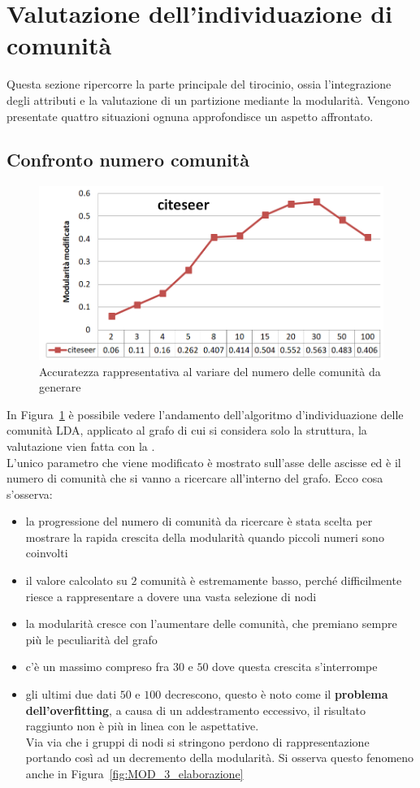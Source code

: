 \section{Valutazione dell'individuazione di comunità}
Questa sezione ripercorre la parte principale del tirocinio, ossia l'integrazione degli attributi e la valutazione di un partizione mediante la modularità. Vengono presentate quattro situazioni ognuna approfondisce un aspetto affrontato.
%
\subsection{Confronto numero comunità}%
%
\begin{figure}[htp]
	\centering
	\includegraphics[width=\linewidth]{immagini/MOD_1_num_cmty}
	\caption{Accuratezza rappresentativa al variare del numero delle comunità da generare}
	\label{fig:MOD_1_num_cmty}
\end{figure}
%
In Figura~\ref{fig:MOD_1_num_cmty} è possibile vedere l'andamento dell'algoritmo d'individuazione delle comunità LDA, applicato al grafo \citeseer di cui si considera solo la struttura, la valutazione vien fatta con la \mmod.\\
L'unico parametro che viene modificato è mostrato sull'asse delle ascisse ed è il numero di comunità che si vanno a ricercare all'interno del grafo. Ecco cosa s'osserva:
\begin{itemize}
	\item la progressione del numero di comunità da ricercare è stata scelta per mostrare la rapida crescita della modularità quando piccoli numeri sono coinvolti
	\item il valore calcolato su $2$ comunità è estremamente basso, perché difficilmente riesce a rappresentare a dovere una vasta selezione di nodi
	\item la modularità cresce con l'aumentare delle comunità, che premiano sempre più le peculiarità del grafo
	\item c'è un massimo compreso fra $30$ e $50$ dove questa crescita s'interrompe
	\item gli ultimi due dati $50$ e $100$ decrescono, questo è noto come il \textbf{problema dell'overfitting}, a causa di un addestramento eccessivo, il risultato raggiunto non è più in linea con le aspettative.\\
	Via via che i gruppi di nodi si stringono perdono di rappresentazione portando così ad un decremento della modularità. Si osserva questo fenomeno anche in Figura~\ref{fig:MOD_3_elaborazione}
\end{itemize}

